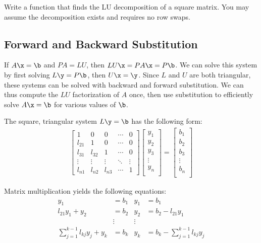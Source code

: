 \begin{problem}
Write a function that finds the LU decomposition of a square matrix.
You may assume the decomposition exists and requires no row swaps.
\label{prob:LU-Decomposition}
\end{problem}

\subsection*{Forward and Backward Substitution} %

If $A\x = \b$ and $PA = LU$, then $LU\x = PA\x = P\b$.
We can solve this system by first solving $L\y = P\b$, then $U\x = \y$.
Since $L$ and $U$ are both triangular, these systems can be solved with backward and forward substitution.
We can thus compute the $LU$ factorization of $A$ once, then use substitution to efficiently solve $A\x=\b$ for various values of $\b$.

The square, triangular system $L\y = \b$ has the following form:
%
\begin{align*}
\left[\begin{array}{ccccc}
1      & 0      & 0      & \cdots & 0 \\
l_{21} & 1      & 0      & \cdots & 0 \\
l_{31} & l_{32} & 1      & \cdots & 0 \\
\vdots & \vdots & \vdots & \ddots & \vdots \\
l_{n1} & l_{n2} & l_{n3} & \cdots & 1
\end{array}\right]
\left[\begin{array}{c}
y_1 \\ y_2 \\ y_3 \\ \vdots \\ y_n \\
\end{array}\right]
=
\left[\begin{array}{c}
b_1 \\ b_2 \\ b_3 \\ \vdots \\ b_n \\
\end{array}\right]
\end{align*}

Matrix multiplication yields the following equations:
%
\begin{align}
\nonumber y_1 &= b_1 & y_1 &= b_1 \\
\nonumber l_{21}y_1 + y_2 &= b_2 & y_2 &= b_2 - l_{21}y_1 \\
\nonumber & \vdots & \vdots & \\
\sum_{j=1}^{k-1}l_{kj}y_j + y_k &= b_k & y_k &= b_k - \sum_{j=1}^{k-1}l_{kj}y_j
\label{eq:forward-substitution}
\end{align}


